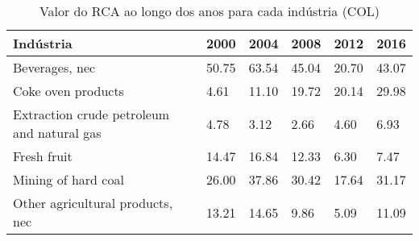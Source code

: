 \begin{table}
\centering
\caption{Valor do RCA ao longo dos anos para cada indústria (COL)}
\label{tab:ex3-tempo-COL}
\begin{tabular}{p{6cm}p{1.5cm}p{1.5cm}p{1.5cm}p{1.5cm}p{1.5cm}}
\toprule
                                 Indústria &  2000 &  2004 &  2008 &  2012 &  2016 \\
\midrule
                            Beverages, nec & 50.75 & 63.54 & 45.04 & 20.70 & 43.07 \\
                        Coke oven products &  4.61 & 11.10 & 19.72 & 20.14 & 29.98 \\
Extraction crude petroleum and natural gas &  4.78 &  3.12 &  2.66 &  4.60 &  6.93 \\
                               Fresh fruit & 14.47 & 16.84 & 12.33 &  6.30 &  7.47 \\
                       Mining of hard coal & 26.00 & 37.86 & 30.42 & 17.64 & 31.17 \\
          Other agricultural products, nec & 13.21 & 14.65 &  9.86 &  5.09 & 11.09 \\
\bottomrule
\end{tabular}
\end{table}
